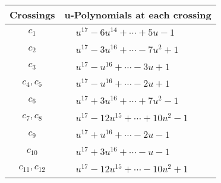 \documentclass[1p]{elsarticle_modified}
\theoremstyle{definition}
\begin{document}
\begin{tabular}{m{50pt}|m{274pt}}
Crossings & \hspace{64pt}u-Polynomials at each crossing \\
\hline $$\begin{aligned}c_{1}\end{aligned}$$&$\begin{aligned}
&u^{17}-6 u^{14}+\cdots+5 u-1
\end{aligned}$\\
\hline $$\begin{aligned}c_{2}\end{aligned}$$&$\begin{aligned}
&u^{17}-3 u^{16}+\cdots-7 u^2+1
\end{aligned}$\\
\hline $$\begin{aligned}c_{3}\end{aligned}$$&$\begin{aligned}
&u^{17}- u^{16}+\cdots-3 u+1
\end{aligned}$\\
\hline $$\begin{aligned}c_{4},c_{5}\end{aligned}$$&$\begin{aligned}
&u^{17}- u^{16}+\cdots-2 u+1
\end{aligned}$\\
\hline $$\begin{aligned}c_{6}\end{aligned}$$&$\begin{aligned}
&u^{17}+3 u^{16}+\cdots+7 u^2-1
\end{aligned}$\\
\hline $$\begin{aligned}c_{7},c_{8}\end{aligned}$$&$\begin{aligned}
&u^{17}-12 u^{15}+\cdots+10 u^2-1
\end{aligned}$\\
\hline $$\begin{aligned}c_{9}\end{aligned}$$&$\begin{aligned}
&u^{17}+u^{16}+\cdots-2 u-1
\end{aligned}$\\
\hline $$\begin{aligned}c_{10}\end{aligned}$$&$\begin{aligned}
&u^{17}+3 u^{16}+\cdots- u-1
\end{aligned}$\\
\hline $$\begin{aligned}c_{11},c_{12}\end{aligned}$$&$\begin{aligned}
&u^{17}-12 u^{15}+\cdots-10 u^2+1
\end{aligned}$\\
\hline
\end{tabular}\\~\\
\end{document}
